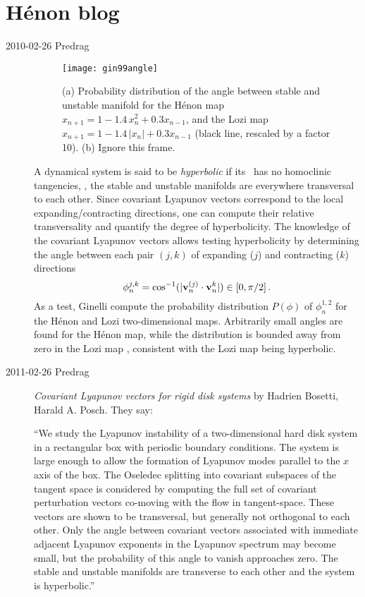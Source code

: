 \section{H\'enon blog}

\begin{description}

\item[2010-02-26 Predrag]
%
\begin{figure}
\begin{center}
\texttt{[image: gin99angle]}
\end{center}
\caption{
(a) Probability distribution of the angle between stable and
unstable manifold for the H\'enon map $x_{n+1} = 1 -1.4\,
x_n^2 + 0.3 x_{n-1}$, and the Lozi map $x_{n+1} = 1
-1.4\,|x_n| + 0.3 x_{n-1}$ (black line, rescaled by a factor
10). (b) Ignore this frame.
}
\label{fig:gin99angle} %
\end{figure}
%

A dynamical system is said to be \emph{hyperbolic} if its
\statesp\ has no homoclinic tangencies, \ie, the stable and
unstable manifolds are everywhere transversal to each other.
Since covariant Lyapunov vectors correspond to the local
expanding/contracting directions, one can compute their
relative transversality and quantify the degree of hyperbolicity.
The knowledge of the covariant Lyapunov vectors allows testing hyperbolicity by
determining the angle between each pair $(j,k)$ of expanding
($j$) and contracting ($k$) directions
\[
\phi_n^{j,k} = \cos^{-1}(|{\bf v}_n^{(j)} \cdot{\bf v}_n^k|) \in [0,\pi/2]
\,.
\]
As a test, Ginelli \etal{} compute the
probability distribution $P(\phi)$ of $\phi_n^{1,2}$ for the
H\'enon and Lozi two-dimensional maps. Arbitrarily small
angles are found for the H\'enon map, while the distribution
is bounded away from zero in the Lozi map ,
consistent with the Lozi map being hyperbolic.

\item[2011-02-26 Predrag]
{\em Covariant Lyapunov vectors for rigid disk systems}
by Hadrien Bosetti, Harald A. Posch. They say:

``We study the Lyapunov instability of a two-dimensional hard disk system
in a rectangular box with periodic boundary conditions. The system is
large enough to allow the formation of Lyapunov modes parallel to the $x$
axis of the box. The Oseledec splitting into covariant subspaces of the
tangent space is considered by computing the full set of covariant
perturbation vectors co-moving with the flow in tangent-space. These
vectors are shown to be transversal, but generally not orthogonal to each
other. Only the angle between covariant vectors associated with immediate
adjacent Lyapunov exponents in the Lyapunov spectrum may become small,
but the probability of this angle to vanish approaches zero. The stable
and unstable manifolds are transverse to each other and the system is
hyperbolic.''


\end{description}
